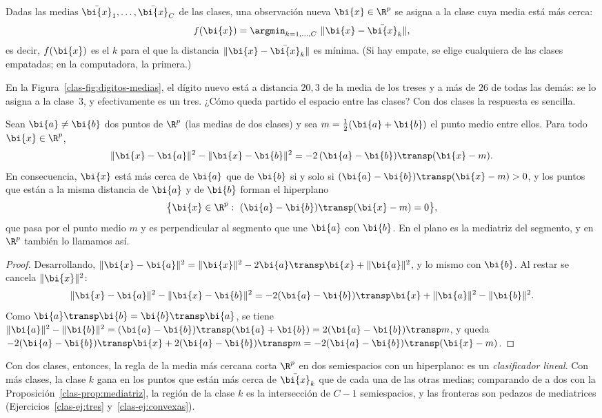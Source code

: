 \begin{definition}\label{clas-def:regla}
Dadas las medias $\bar{\bi{x}}_1,\dots,\bar{\bi{x}}_C$ de las clases, una observación
nueva $\bi{x}\in\R^p$ se asigna a la clase cuya media está más cerca:
\[
f(\bi{x})=\argmin_{k=1,\dots,C}\ \|\bi{x}-\bar{\bi{x}}_k\| ,
\]
es decir, $f(\bi{x})$ es el $k$ para el que la distancia $\|\bi{x}-\bar{\bi{x}}_k\|$ es mínima.
(Si hay empate, se elige cualquiera de las clases empatadas; en la
computadora, la primera.)
\end{definition}

En la Figura~\ref{clas-fig:digitos-medias}, el dígito nuevo está a distancia
$20{,}3$ de la media de los treses y a más de $26$ de todas las demás: se lo
asigna a la clase~3, y efectivamente es un tres. ¿Cómo queda partido el
espacio entre las clases? Con dos clases la respuesta es sencilla.

\begin{proposition}\label{clas-prop:mediatriz}
Sean $\bi{a}\ne \bi{b}$ dos puntos de $\R^p$ (las medias de dos clases) y sea
$m=\frac12(\bi{a}+\bi{b})$ el punto medio entre ellos. Para todo $\bi{x}\in\R^p$,
\[
\|\bi{x}-\bi{a}\|^2-\|\bi{x}-\bi{b}\|^2=-2\,(\bi{a}-\bi{b})\transp(\bi{x}-m).
\]
En consecuencia, $\bi{x}$ está más cerca de $\bi{a}$ que de $\bi{b}$ si y solo si
$(\bi{a}-\bi{b})\transp(\bi{x}-m)>0$, y los puntos que están a la misma distancia de $\bi{a}$ y de
$\bi{b}$ forman el hiperplano
\[
\bigl\{\bi{x}\in\R^p:\ (\bi{a}-\bi{b})\transp(\bi{x}-m)=0\bigr\},
\]
que pasa por el punto medio $m$ y es perpendicular al segmento que une $\bi{a}$ con
$\bi{b}$. En el plano es la mediatriz del segmento, y en $\R^p$ también lo llamamos
así.
\end{proposition}

\begin{proof}
Desarrollando, $\|\bi{x}-\bi{a}\|^2=\|\bi{x}\|^2-2\bi{a}\transp \bi{x}+\|\bi{a}\|^2$, y lo mismo con $\bi{b}$. Al
restar se cancela $\|\bi{x}\|^2$:
\[
\|\bi{x}-\bi{a}\|^2-\|\bi{x}-\bi{b}\|^2=-2(\bi{a}-\bi{b})\transp \bi{x}+\|\bi{a}\|^2-\|\bi{b}\|^2 .
\]
Como $\bi{a}\transp \bi{b}=\bi{b}\transp \bi{a}$, se tiene $\|\bi{a}\|^2-\|\bi{b}\|^2=(\bi{a}-\bi{b})\transp(\bi{a}+\bi{b})=2(\bi{a}-\bi{b})\transp m$,
y queda $-2(\bi{a}-\bi{b})\transp \bi{x}+2(\bi{a}-\bi{b})\transp m=-2(\bi{a}-\bi{b})\transp(\bi{x}-m)$.
\end{proof}

Con dos clases, entonces, la regla de la media más cercana corta $\R^p$ en dos
semiespacios con un hiperplano: es un \emph{clasificador lineal}. Con más
clases, la clase $k$ gana en los puntos que están más cerca de $\bar{\bi{x}}_k$ que
de cada una de las otras medias; comparando de a dos con la
Proposición~\ref{clas-prop:mediatriz}, la región de la clase $k$ es la
intersección de $C-1$ semiespacios, y las fronteras son pedazos de mediatrices
(Ejercicios~\ref{clas-ej:tres} y~\ref{clas-ej:convexas}).


